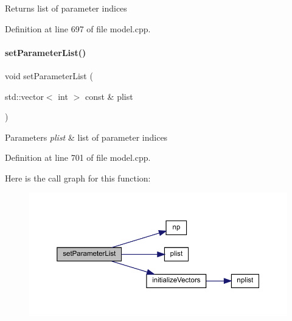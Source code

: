 \begin{DoxyReturn}{Returns}
list of parameter indices 
\end{DoxyReturn}


Definition at line 697 of file model.\+cpp.

\mbox{\label{classamici_1_1_model_a2afe974183e4bccaf746f6409941fe8f}} 
\paragraph{\texorpdfstring{setParameterList()}{setParameterList()}}
{\footnotesize\ttfamily void set\+Parameter\+List (\begin{DoxyParamCaption}\item[{std\+::vector$<$ int $>$ const \&}]{plist }\end{DoxyParamCaption})}


\begin{DoxyParams}{Parameters}
{\em plist} & list of parameter indices \\
\hline
\end{DoxyParams}


Definition at line 701 of file model.\+cpp.

Here is the call graph for this function\+:
\nopagebreak
\begin{figure}[H]
\begin{center}
\leavevmode
\includegraphics[width=350pt]{classamici_1_1_model_a2afe974183e4bccaf746f6409941fe8f_cgraph}
\end{center}
\end{figure}
\mbox{\label{classamici_1_1_model_a34b007de55db268995bdc788accdc57d}} 
